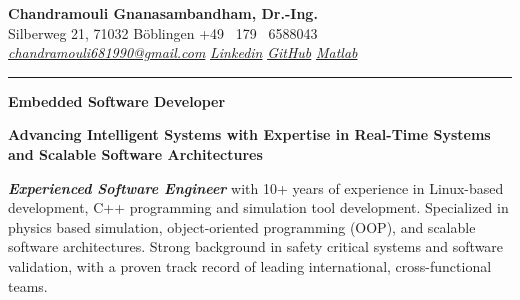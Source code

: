 \documentclass[a4paper,10pt]{article}
\newcommand{\link}[1]{{\textit{#1}}}
\begin{document}
\thispagestyle{plain}

\begin{center}
    {\Large \textbf{Chandramouli Gnanasambandham, Dr.-Ing.}}\\ 
    
    \vspace{0.2cm}
    \small Silberweg 21, 71032 B\"oblingen \hfill  \bullet  \hfill  +49 \ 179 \ 6588043 \hfill \bullet  \hfill
    \textup{\href{mailto:chandramouli681990@gmail.com}{\link{chandramouli681990@gmail.com}}} \hfill \bullet \hfill
    \textup{\href{https://linkedin.com/in/ganasambandhamc}{\link{Linkedin}}} \hfill \bullet \hfill
    \textup{\href{https://github.com/chandramouli6890}{\link{GitHub}}} \hfill \bullet \hfill
    \textup{\href{https://de.mathworks.com/matlabcentral/profile/authors/4267772}{\link{Matlab}}}

    \vspace{-0.2cm}
    {\rule{\linewidth}{0.8pt}}

    \vspace{0.2cm}
    {\Large \textbf{Embedded Software Developer}}
    
    \vspace{0.1cm}
    \colorbox{gray!40}{%
        \parbox{0.99\textwidth}{%
            \centering \textcolor{highlightcolor}{\textbf{Advancing Intelligent Systems with Expertise in Real-Time Systems and Scalable Software Architectures}}
        }%
    }
\end{center}


\noindent \textcolor{highlightcolor}{\textit{\textbf{Experienced Software
Engineer}}} with 10+ years of experience in Linux-based development, C++
programming and simulation tool development. Specialized in physics based
simulation, object-oriented programming (OOP), and scalable software architectures.
Strong background in safety critical systems and software validation, with a
proven track record of leading international, cross-functional teams.
\end{document}
